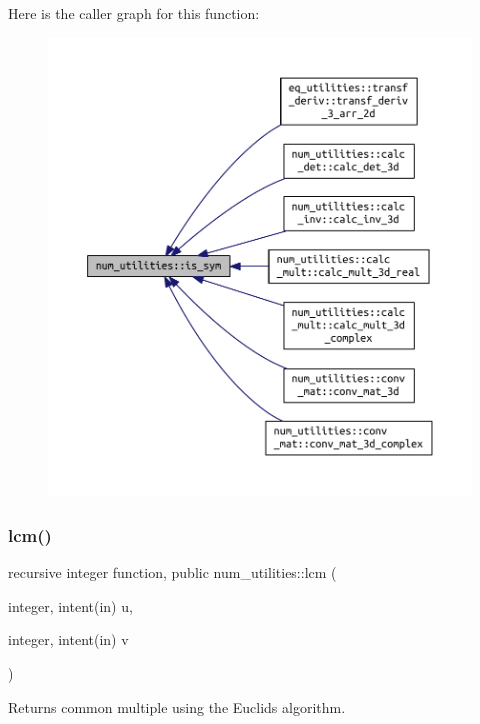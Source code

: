 Here is the caller graph for this function\+:\nopagebreak
\begin{figure}[H]
\begin{center}
\leavevmode
\includegraphics[width=350pt]{namespacenum__utilities_a4e6994b5c92b3d16c8538b54db0beadd_icgraph}
\end{center}
\end{figure}
\mbox{\label{namespacenum__utilities_a33fc1483c840d5d3f9b12acfce21cad1}} 
\subsubsection{\texorpdfstring{lcm()}{lcm()}}
{\footnotesize\ttfamily recursive integer function, public num\+\_\+utilities\+::lcm (\begin{DoxyParamCaption}\item[{integer, intent(in)}]{u,  }\item[{integer, intent(in)}]{v }\end{DoxyParamCaption})}



Returns common multiple using the Euclid\textquotesingle{}s algorithm. 

